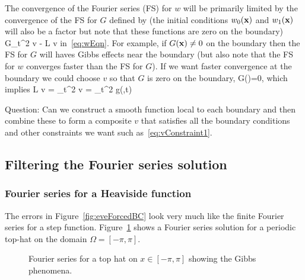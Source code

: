 The convergence of the Fourier series (FS) for $w$ will be primarily limited by the convergence
of the FS for $G$ defined by (the initial conditions $w_0(\mathbf{ x})$ and $w_1(\mathbf{ x})$ 
will also be a factor but note that these functions are zero on the boundary)
\ba
  G\eqdef \p_t^2 v - L v
\ea
in~\eqref{eq:wEqn}. For example, if $G(\mathbf{ x})\ne 0$ on the boundary then the FS for $G$ will haves Gibbs effects near the
boundary (but also note that the FS for $w$ converges faster than the FS for $G$).
If we want faster convergence at the boundary we could choose $v$ so that $G$ is zero
on the boundary,
\ba
   G(\xv)=0, \qquad \xv\in\partial\Omega
\ea
which implies
\ba
   L v = \p_t^2 v = \p_t^2 g(\xv,t)  \qquad \xv\in\partial\Omega \label{eq:vConstraint1}
\ea

\mni
{\red Question:} Can we construct a smooth function local to each boundary and then combine these to form
a composite $v$ that satisfies all the boundary conditions and other constraints we want such as~\eqref{eq:vConstraint1}.

\clearpage
\subsection{Filtering the Fourier series solution} \label{sec:filtering}

\subsubsection{Fourier series for a Heaviside function}
The errors in Figure~\ref{fig:eveForcedBC} look very much like the finite Fourier series for 
a step function. Figure~\ref{fig:topHatSeries} shows a Fourier series solution for a periodic 
top-hat on the domain $\Omega=[-\pi,\pi]$.

{
\newcommand{\width}{6cm}
\begin{figure}[htb]
\begin{center}
\end{center}
\caption{Fourier series for a top hat on $x\in[-\pi,\pi]$ showing the Gibbs phenomena.
    }
\label{fig:topHatSeries}
\end{figure}
}


